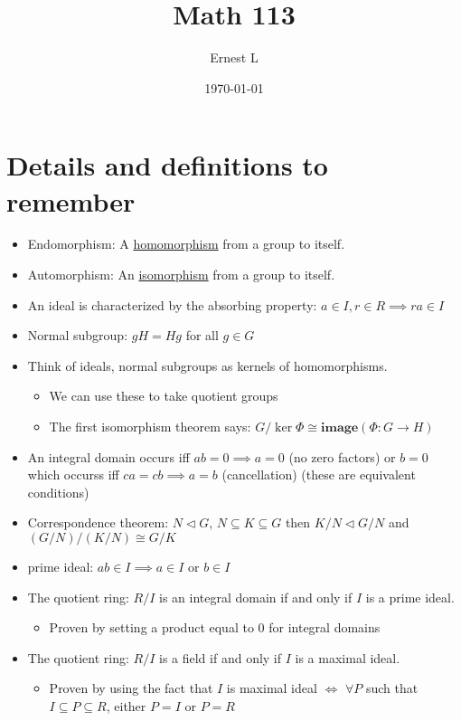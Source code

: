 \documentclass[11pt]{article}
\author{Ernest L}
\date{\today}
\title{Math 113}
\begin{document}
\maketitle
\section{Details and definitions to remember}

\begin{itemize}
    \item Endomorphism: A \underline{homomorphism} from a group to itself.
    \item Automorphism: An \underline{isomorphism} from a group to itself.
    \item An ideal is characterized by the absorbing property: $a \in I, r \in R \implies ra \in I$
    \item Normal subgroup: $gH = Hg$ for all $g \in G$
    \item Think of ideals, normal subgroups as kernels of homomorphisms.
    \begin{itemize}
        \item We can use these to take quotient groups 
        \item The first isomorphism theorem says: $G/\ker \Phi \cong \textbf{image} (\Phi: G \to H)$
    \end{itemize}
    \item An integral domain occurs iff $ab = 0 \implies a = 0$ (no zero factors) or $b = 0$ which occurss iff $ca = cb \implies a = b$ (cancellation) (these are equivalent conditions)
    \item Correspondence theorem: $N \triangleleft G$, $N \subseteq K \subseteq G$ then $K/N \triangleleft G/N$ and $(G/N)/(K/N) \cong G/K$
    \item prime ideal: $ab \in I \implies a \in I$ or $b \in I$
    \item The quotient ring: $R / I$ is an integral domain if and only if $I$ is a prime ideal.
    \begin{itemize}
        \item Proven by setting a product equal to $0$ for integral domains
    \end{itemize}
    \item The quotient ring: $R / I$ is a field if and only if $I$ is a maximal ideal.
    \begin{itemize}
        \item Proven by using the fact that $I$ is maximal ideal $\iff$ $\forall P$ such that $I \subseteq P \subseteq R$, either $P = I$ or $P = R$

\end{itemize}
\end{itemize}
\end{document}
